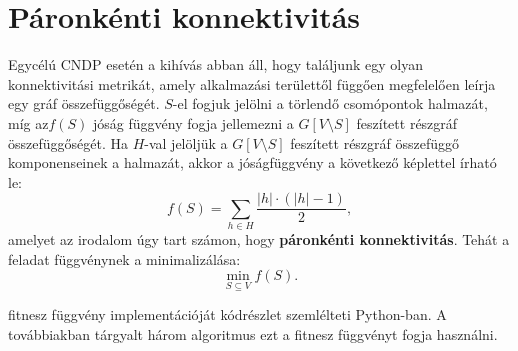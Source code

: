 \section{Páronkénti konnektivitás}\label{sec:PAIRWISE_CONNECTIVITY}

Egycélú CNDP esetén a kihívás abban áll, hogy találjunk egy olyan konnektivitási metrikát,
amely alkalmazási területtől függően megfelelően leírja egy gráf összefüggőségét.
$S$-el fogjuk jelölni a törlendő csomópontok halmazát,
míg az$f(S)$ jóság függvény fogja jellemezni a $G[V \setminus S]$ feszített részgráf összefüggőségét.
Ha $H$-val jelöljük a $G[V \setminus S]$ feszített részgráf összefüggő komponenseinek a halmazát,
akkor a jóságfüggvény a következő képlettel írható le:
\begin{equation}\label{eqn:PAIRWISE_CONNECTIVITY}
  f(S) = \sum_{h \in H} \frac{|h| \cdot (|h| - 1)}{2},
\end{equation}
amelyet az irodalom \cite{ventresca2012global, aringhieri2016general} úgy tart számon,
hogy \textbf{páronkénti konnektivitás}.
Tehát a feladat  függvénynek a minimalizálása:
\begin{equation}\label{eqn:MIN_PAIRWISE_CONNECTIVITY}
  \min_{S \subseteq V} f(S).
\end{equation}

 fitnesz függvény implementációját
 kódrészlet szemlélteti Python-ban.
A továbbiakban tárgyalt három algoritmus ezt a fitnesz függvényt fogja használni.

